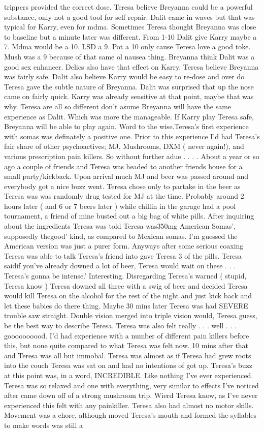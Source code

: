 \documentclass[12pt]{book}
\begin{document}
trippers provided the correct dose. Teresa believe Breyanna could be a powerful substance, only not a good tool for self repair. Dalit came in waves but that was typical for Karry, even for mdma. Sometimes Teresa thought Breyanna was close to baseline but a minute later was different. From 1-10 Dalit give Karry maybe a 7. Mdma would be a 10. LSD a 9. Pot a 10 only cause Teresa love a good toke. Mush was a 9 because of that same ol nausea thing. Breyanna think Dalit was a good sex enhancer. Delics also have that effect on Karry. Teresa believe Breyanna was fairly safe. Dalit also believe Karry would be easy to re-dose and over do Teresa gave the subtle nature of Breyanna. Dalit was surprised that up the nose came on fairly quick. Karry was already sensitive at that point, maybe that was why. Teresa are all so different don't asume Breyanna will have the same experience as Dalit. Which was more the manageable. If Karry play Teresa safe, Breyanna will be able to play again. Word to the wise.Teresa's first experience with somas was definately a positive one. Prior to this experience I'd had Teresa's fair share of other psychoactives; MJ, Mushrooms, DXM ( never again!), and various prescription pain killers. So without further adue . . .  . About a year or so ago a couple of friends and Teresa was headed to another friends house for a small party/kickback. Upon arrival much MJ and beer was passed around and everybody got a nice buzz went. Teresa chose only to partake in the beer as Teresa was was randomly drug tested for MJ at the time. Probably around 2 hours later ( and 6 or 7 beers later ) while chillin in the garage had a pool tournament, a friend of mine busted out a big bag of white pills. After inquiring about the ingredients Teresa was told Teresa was350mg American Somas', supposedly thegood' kind, as compared to Mexican somas. I'm guessed the American version was just a purer form. Anyways after some serious coaxing Teresa was able to talk Teresa's friend into gave Teresa 3 of the pills. Teresa saidif you've already downed a lot of beer, Teresa would wait on these . . .  Teresa's gonna be intense.' Interesting. Disregarding Teresa's warned ( stupid, Teresa know ) Teresa downed all three with a swig of beer and decided Teresa would kill Teresa on the alcohol for the rest of the night and just kick back and let these babies do there thing. Maybe 30 mins later Teresa was had SEVERE trouble saw straight. Double vision merged into triple vision would, Teresa guess, be the best way to describe Teresa. Teresa was also felt really . . .  well . . .  goooooooood. I'd had experience with a number of different pain killers before this, but none quite compared to what Teresa was felt now. 10 mins after that and Teresa was all but immobal. Teresa was almost as if Teresa had grew roots into the couch Teresa was sat on and had no intentions of got up. Teresa's buzz at this point was, in a word, INCREDIBLE. Like nothing I've ever experienced. Teresa was so relaxed and one with everything, very similar to effects I've noticed after came down off of a strong mushroom trip. Wierd Teresa know, as I've never experienced this felt with any painkiller. Teresa also had almost no motor skills. Movement was a chore, although moved Teresa's mouth and formed the syllables to make words was still a 
\end{document}
